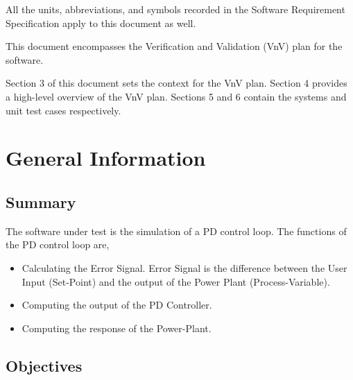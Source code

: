 \documentclass[12pt, titlepage]{article}
\begin{document}

All the units, abbreviations, and symbols recorded in the Software Requirement 
Specification \cite{SRS} apply to this document as well.

\newpage


This document encompasses the Verification and Validation (VnV) plan for the
\progname{} software. 

Section 3 of this document sets the context for the VnV plan. Section 4  provides
a high-level overview of the VnV plan. Sections 5 and 6 contain the systems and 
unit test cases respectively. 


\section{General Information}

\subsection{Summary}


The software under test is the simulation of a PD control loop. The functions of 
the PD control loop are,

\begin{itemize}
\item Calculating the Error Signal. Error Signal is the difference between the User 
Input (Set-Point) and the output of the Power Plant (Process-Variable).
\item Computing the output of the PD Controller.
\item Computing the response of the Power-Plant.
\end{itemize}

\subsection{Objectives}

  
\end{document}
